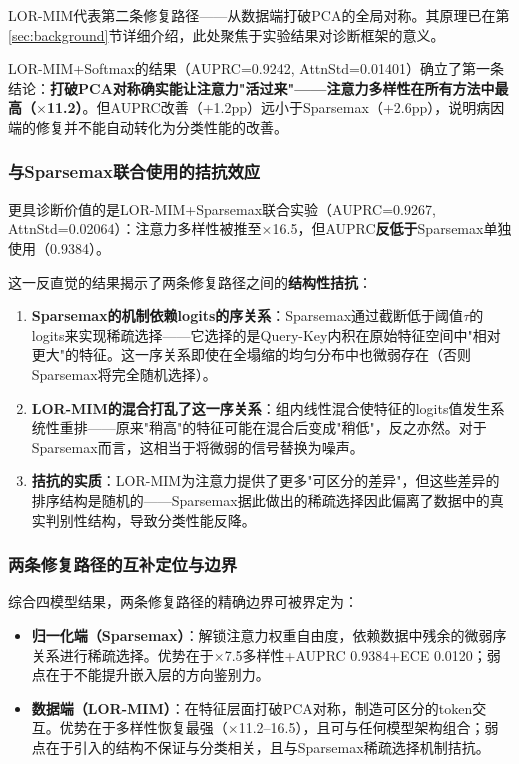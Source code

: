 LOR-MIM代表第二条修复路径——从数据端打破PCA的全局对称。其原理已在第\ref{sec:background}节详细介绍，此处聚焦于实验结果对诊断框架的意义。

LOR-MIM+Softmax的结果（AUPRC=0.9242, AttnStd=0.01401）确立了第一条结论：\textbf{打破PCA对称确实能让注意力"活过来"——注意力多样性在所有方法中最高（$\times$11.2）}。但AUPRC改善（+1.2pp）远小于Sparsemax（+2.6pp），说明病因端的修复并不能自动转化为分类性能的改善。

\subsubsection{与Sparsemax联合使用的拮抗效应}

更具诊断价值的是LOR-MIM+Sparsemax联合实验（AUPRC=0.9267, AttnStd=0.02064）：注意力多样性被推至$\times$16.5，但AUPRC\textbf{反低于}Sparsemax单独使用（0.9384）。

这一反直觉的结果揭示了两条修复路径之间的\textbf{结构性拮抗}：
\begin{enumerate}
    \item \textbf{Sparsemax的机制依赖logits的序关系}：Sparsemax通过截断低于阈值$\tau$的logits来实现稀疏选择——它选择的是Query-Key内积在原始特征空间中"相对更大"的特征。这一序关系即使在全塌缩的均匀分布中也微弱存在（否则Sparsemax将完全随机选择）。
    \item \textbf{LOR-MIM的混合打乱了这一序关系}：组内线性混合使特征的logits值发生系统性重排——原来"稍高"的特征可能在混合后变成"稍低"，反之亦然。对于Sparsemax而言，这相当于将微弱的信号替换为噪声。
    \item \textbf{拮抗的实质}：LOR-MIM为注意力提供了更多"可区分的差异"，但这些差异的排序结构是随机的——Sparsemax据此做出的稀疏选择因此偏离了数据中的真实判别性结构，导致分类性能反降。
\end{enumerate}

\subsubsection{两条修复路径的互补定位与边界}

综合四模型结果，两条修复路径的精确边界可被界定为：
\begin{itemize}
    \item \textbf{归一化端（Sparsemax）}：解锁注意力权重自由度，依赖数据中残余的微弱序关系进行稀疏选择。优势在于$\times$7.5多样性+AUPRC 0.9384+ECE 0.0120；弱点在于不能提升嵌入层的方向鉴别力。
    \item \textbf{数据端（LOR-MIM）}：在特征层面打破PCA对称，制造可区分的token交互。优势在于多样性恢复最强（$\times$11.2--16.5），且可与任何模型架构组合；弱点在于引入的结构不保证与分类相关，且与Sparsemax稀疏选择机制拮抗。
\end{itemize}

